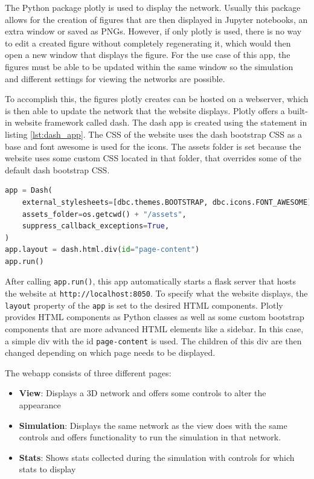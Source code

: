 The Python package plotly \cite{plotly} is used to display the network. Usually this package allows for the creation of figures that are then displayed in Jupyter notebooks, an extra window or saved as PNGs. However, if only plotly is used, there is no way to edit a created figure without completely regenerating it, which would then open a new window that displays the figure. For the use case of this app, the figures must be able to be updated within the same window so the simulation and different settings for viewing the networks are possible.

To accomplish this, the figures plotly creates can be hosted on a webserver, which is then able to update the network that the website displays. Plotly offers a built-in website framework called dash. The dash app is created using the statement in listing \ref{lst:dash_app}. The CSS of the website uses the dash bootstrap CSS as a base and font awesome \cite{fontAwesome} is used for the icons. The assets folder is set because the website uses some custom CSS located in that folder, that overrides some of the default dash bootstrap CSS.

\begin{lstlisting}[language=python, caption={Instatiate a new Dash app}, label={lst:dash_app}]
app = Dash(
    external_stylesheets=[dbc.themes.BOOTSTRAP, dbc.icons.FONT_AWESOME],
    assets_folder=os.getcwd() + "/assets",
    suppress_callback_exceptions=True,
)
app.layout = dash.html.div(id="page-content")
app.run()
\end{lstlisting}

After calling \texttt{app.run()}, this app automatically starts a flask server that hosts the website at \texttt{http://localhost:8050}. To specify what the website displays, the \texttt{layout} property of the \texttt{app} is set to the desired HTML components. Plotly provides HTML components as Python classes as well as some custom bootstrap components that are more advanced HTML elements like a sidebar. In this case, a simple div with the id \texttt{page-content} is used. The children of this div are then changed depending on which page needs to be displayed.

The webapp consists of three different pages:
\begin{itemize}
    \item \textbf{View}: Displays a 3D network and offers some controls to alter the appearance
    \item \textbf{Simulation}: Displays the same network as the view does with the same controls and offers functionality to run the simulation in that network.
    \item \textbf{Stats}: Shows stats collected during the simulation with controls for which 
    stats to display
\end{itemize}

